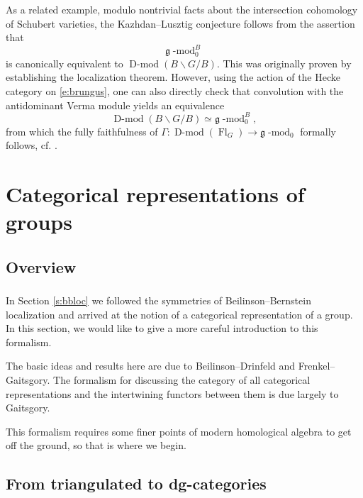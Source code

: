 \documentclass[10pt]{amsart}
\newcommand{\fg}{\mathfrak{g}}
\newcommand{\on}{\operatorname}
\renewcommand{\mod}{\on{-mod}}
\newcommand{\Dmod}{\on{D-mod}}
\theoremstyle{remark}
\newcommand{\Fl}{\operatorname{Fl}}
\numberwithin{equation}{section}
\renewcommand{\mod}{\operatorname{-mod}}
\begin{document}

As a related example, modulo nontrivial facts about the intersection cohomology 
of Schubert varieties, the Kazhdan--Lusztig conjecture follows from the assertion 
that 
%
\begin{equation} \label{e:brungus}
  \fg\mod_0^B
\end{equation}
%
is canonically equivalent to $\Dmod(B \backslash G / B)$. This was originally 
proven by establishing the localization theorem. However, using the action of 
the Hecke category on \eqref{e:brungus}, one can also directly check that 
convolution with the antidominant Verma module yields an equivalence
%
\[
  \Dmod(B \backslash G / B) \simeq \fg\mod_0^B, 
\]
%
from which the fully faithfulness of $\Gamma: \Dmod(\Fl_G) \rightarrow \fg\mod_0$ formally follows, cf. \cite{ahc}. 




	\section{Categorical representations of groups}
	\label{s:catrepgrp}
	
	
	\subsection{Overview}

\subsubsection{} In Section \ref{s:bbloc} we followed the symmetries of 
Beilinson--Bernstein localization and arrived at the notion of a categorical 
representation of a group. In this section, we would like to give a more careful introduction to this formalism.

The basic ideas and results here are due to Beilinson--Drinfeld and Frenkel--Gaitsgory. The formalism for discussing the category of all categorical representations and the intertwining functors between them is due largely to Gaitsgory. 

 This formalism requires some finer points of modern homological algebra to get off the ground, so that is where we begin. 



\subsection{From triangulated to dg-categories}
\end{document}
